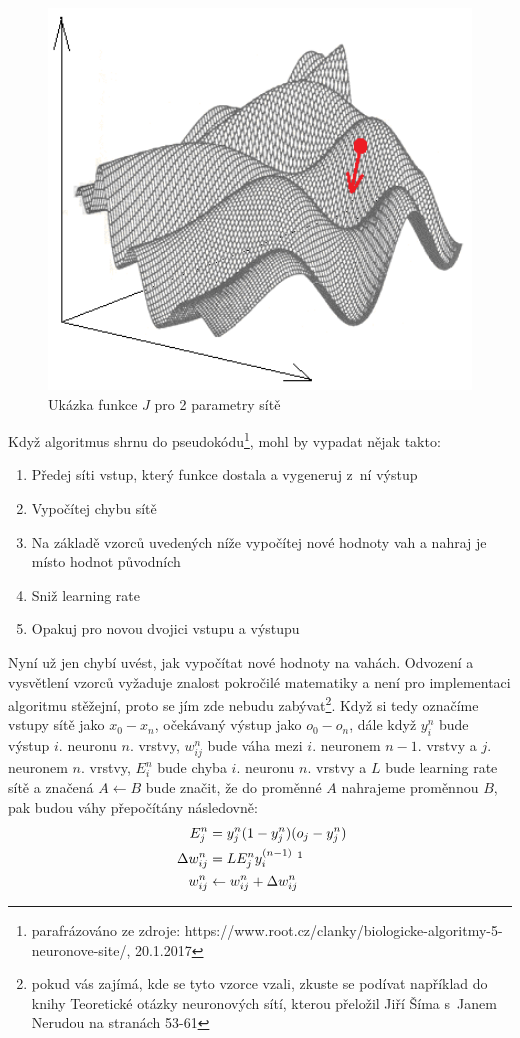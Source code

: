 \documentclass[a4paper]{article}
\begin{document}
\begin{figure}[h]
	\includegraphics[width=14cm]{backpropagation.png}
	\caption{Ukázka funkce $J$ pro 2 parametry sítě}
	\label{odkaz}
	\centering
\end{figure}
\clearpage
Když algoritmus shrnu do pseudokódu\footnote{parafrázováno ze zdroje: https://www.root.cz/clanky/biologicke-algoritmy-5-neuronove-site/, 20.1.2017}, mohl by vypadat nějak takto:
\begin{enumerate}
	\item Předej síti vstup, který funkce dostala a vygeneruj z~ní výstup
	\item Vypočítej chybu sítě
	\item Na základě vzorců uvedených níže vypočítej nové hodnoty vah a nahraj je místo hodnot původních
	\item Sniž learning rate
	\item Opakuj pro novou dvojici vstupu a výstupu 
\end{enumerate} \par
Nyní už jen chybí uvést, jak vypočítat nové hodnoty na vahách. Odvození a vysvětlení vzorců vyžaduje znalost pokročilé matematiky a není pro implementaci algoritmu stěžejní, proto se jím zde nebudu zabývat\footnote{pokud vás zajímá, kde se tyto vzorce vzali, zkuste se podívat například do knihy Teoretické otázky neuronových sítí, kterou přeložil Jiří Šíma s~Janem Nerudou na stranách 53-61}. Když si tedy označíme vstupy sítě jako $x_0 - x_n$, očekávaný výstup jako $o_0 - o_n$, dále když $y^n_i$ bude výstup $i$. neuronu $n$. vrstvy, $w^n_{ij}$ bude váha mezi $i$. neuronem $n-1$. vrstvy a $j$. neuronem $n$. vrstvy, $E^n_i$ bude chyba $i$. neuronu $n$. vrstvy a $L$ bude learning rate sítě a značená $A \leftarrow B$ bude značit, že do proměnné $A$ nahrajeme proměnnou $B$, pak budou váhy přepočítány následovně:
\begin{align*}
	E^{n}_j &= y^{n}_j(1-y^{n}_j)(o_j - y^{n}_j)\\\
	\Delta w^{n}_{ij} &= LE^{n}_jy_i^{(n-1)}~\footnotemark\\
	w^n_{ij} &\leftarrow w^n_{ij} + \Delta w^n_{ij}
\end{align*}
\end{document}
